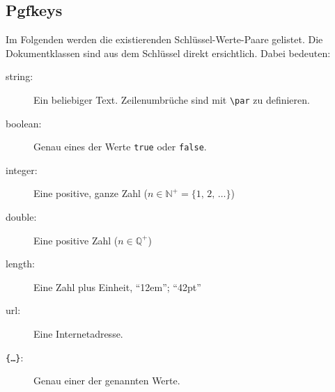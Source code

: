 		\subsection{Pgfkeys}
			Im Folgenden werden die existierenden Schlüssel-Werte-Paare gelistet. Die Dokumentklassen sind aus dem Schlüssel direkt ersichtlich. Dabei bedeuten:
			\begin{description}
				\item[string:] 
						Ein beliebiger Text. Zeilenumbrüche sind mit \verb|\par| zu definieren.
				\item[boolean:] 
						Genau eines der Werte \texttt{true} oder \texttt{false}.
				\item[integer:]
						Eine positive, ganze Zahl ($n \in \mathbb N^+ = \{1, \, 2, \, \ldots\}$)
				\item[double:]
						Eine positive Zahl ($n \in \mathbb Q^+$)
				\item[length:]
						Eine Zahl plus Einheit, \zb "`12em"'; "`42pt"'
				\item[url:]
						Eine Internetadresse.
				\item[{\tt \{\ldots\}}:] 
						Genau einer der genannten Werte.
			\end{description}
			\newpage
